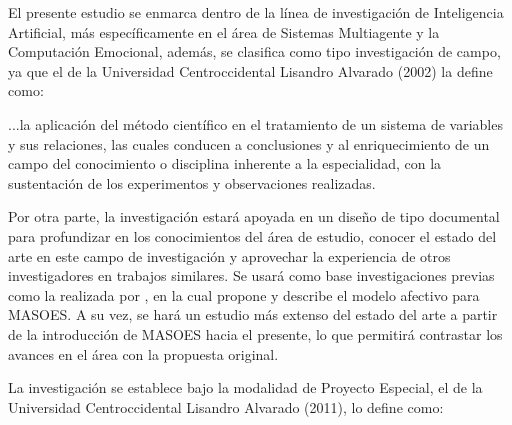 %
%
%



El presente estudio se enmarca dentro de la línea de investigación de
Inteligencia Artificial, más específicamente en el área de Sistemas Multiagente
y la Computación Emocional, además, se clasifica como tipo investigación de
campo, ya que el  de la Universidad
Centroccidental Lisandro Alvarado (2002) la define como:

\begin{citatextual}
...la aplicación del método científico en el tratamiento de un sistema de
variables y sus relaciones, las cuales conducen a conclusiones y al
enriquecimiento de un campo del conocimiento o disciplina inherente a la
especialidad, con la sustentación de los experimentos y observaciones
realizadas.
\end{citatextual}

Por otra parte, la investigación estará apoyada en un diseño de tipo documental
para profundizar en los conocimientos del área de estudio, conocer el estado del
arte en este campo de investigación y aprovechar la experiencia de otros
investigadores en trabajos similares. Se usará como base investigaciones previas
como la realizada por \cite{perozo2011}, en la cual propone y describe el
modelo afectivo para MASOES. A su vez, se hará un estudio más extenso del estado
del arte a partir de la introducción de MASOES hacia el presente, lo que
permitirá contrastar los avances en el área con la propuesta original.


La investigación se establece bajo la modalidad de Proyecto Especial, el  de la Universidad
Centroccidental Lisandro Alvarado (2011), lo define como:


